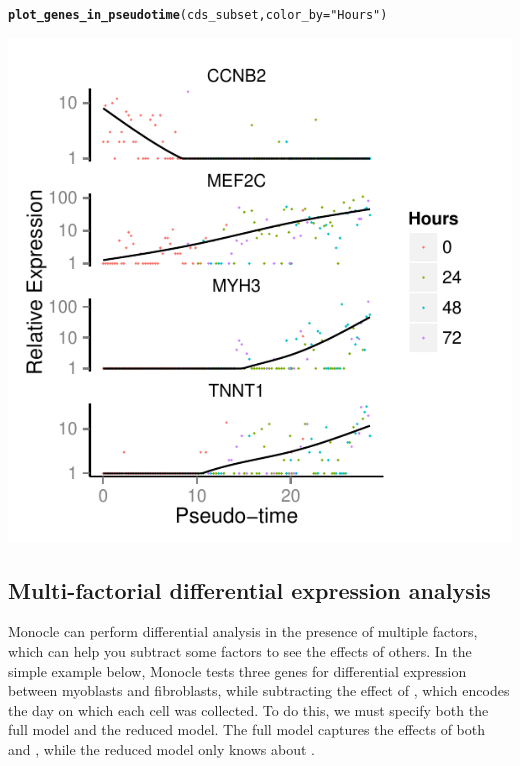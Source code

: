 \documentclass[10pt,oneside]{article}\usepackage[]{graphicx}\usepackage[]{color}
\makeatletter
\def\maxwidth{ %
  \ifdim\Gin@nat@width>\linewidth
    \linewidth
  \else
    \Gin@nat@width
  \fi
}
\newcommand{\hlstr}[1]{\textcolor[rgb]{0.192,0.494,0.8}{#1}}%
\newcommand{\hlstd}[1]{\textcolor[rgb]{0.345,0.345,0.345}{#1}}%
\newcommand{\hlkwc}[1]{\textcolor[rgb]{0.333,0.667,0.333}{#1}}%
\newcommand{\hlkwd}[1]{\textcolor[rgb]{0.737,0.353,0.396}{\textbf{#1}}}%
\newenvironment{kframe}{%
 \def\at@end@of@kframe{}%
 \ifinner\ifhmode%
  \def\at@end@of@kframe{\end{minipage}}%
  \begin{minipage}{\columnwidth}%
 \fi\fi%
 \def\FrameCommand##1{\hskip\@totalleftmargin \hskip-\fboxsep
 \colorbox{shadecolor}{##1}\hskip-\fboxsep
     \hskip-\linewidth \hskip-\@totalleftmargin \hskip\columnwidth}%
 \MakeFramed {\advance\hsize-\width
   \@totalleftmargin\z@ \linewidth\hsize
   \@setminipage}}%
 {\par\unskip\endMakeFramed%
 \at@end@of@kframe}
\newenvironment{knitrout}{}{} %
\makeatother
\begin{document}
\begin{knitrout}
\color{fgcolor}\begin{kframe}
\begin{alltt}
\hlkwd{plot_genes_in_pseudotime}\hlstd{(cds_subset,} \hlkwc{color_by}\hlstd{=}\hlstr{"Hours"}\hlstd{)}
\end{alltt}
\end{kframe}

{\centering \includegraphics[width=\maxwidth]{figure/plot_diff_res_pt-1} 

}



\end{knitrout}

\subsection{Multi-factorial differential expression analysis}

Monocle can perform differential analysis in the presence of multiple factors, which can help you subtract some factors to see the effects of others.  In the simple example below, Monocle tests three genes for differential expression between myoblasts and fibroblasts, while subtracting the effect of , which encodes the day on which each cell was collected. To do this, we must specify both the full model and the reduced model. The full model captures the effects of both  and , while the reduced model only knows about .  
\end{document}
